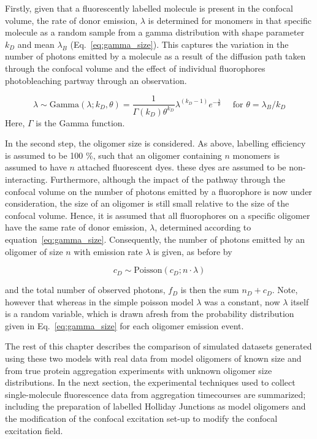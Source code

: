 Firstly, given that a fluorescently labelled molecule is present in the confocal volume, the rate of donor emission, $\lambda$ is determined for monomers in that specific molecule as a random sample from a gamma distribution with shape parameter $k_D$ and mean $\lambda_B$ (Eq.~\ref{eq:gamma_size}). This captures the variation in the number of photons emitted by a molecule as a result of the diffusion path taken through the confocal volume and the effect of individual fluorophores photobleaching partway through an observation.

\begin{equation}
\lambda \sim \text{Gamma}(\lambda; k_D, \theta) =  \frac{1}{\Gamma(k_D) \theta^{k_D}} \lambda^{(k_D - 1)} e^{-\frac{\lambda}{\theta}} \quad\text{ for } \theta = \lambda_B / k_D
\label{eq:gamma_size}
\end{equation} 
Here, $\Gamma$ is the Gamma function. 

In the second step, the oligomer size is considered. As above, labelling efficiency is assumed to be 100 \%, such that an oligomer containing $n$ monomers is assumed to have $n$ attached fluorescent dyes. these dyes are assumed to be non-interacting. Furthermore, although the impact of the pathway through the confocal volume on the number of photons emitted by a fluorophore is now under consideration, the size of an oligomer is still small relative to the size of the confocal volume. Hence, it is assumed that all fluorophores on a specific oligomer have the same rate of donor emission, $\lambda$, determined according to equation~\ref{eq:gamma_size}. Consequently, the number of photons emitted by an oligomer of size $n$ with emission rate $\lambda$ is given, as before by

\begin{equation}
c_D \sim \text{Poisson}(c_D; n \cdot \lambda)
\end{equation}  

and the total number of observed photons, $f_D$ is then the sum $n_D + c_D$. Note, however that whereas in the simple poisson model $\lambda$ was a constant, now $\lambda$ itself is a random variable, which is drawn afresh from the probability distribution given in Eq.~\ref{eq:gamma_size} for each oligomer emission event.

The rest of this chapter describes the comparison of simulated datasets generated using these two models with real data from model oligomers of known size and from true protein aggregation experiments with unknown oligomer size distributions. In the next section, the experimental techniques used to collect single-molecule fluorescence data from aggregation timecourses are summarized; including the preparation of labelled Holliday Junctions as model oligomers and the modification of the confocal excitation set-up to modify the confocal excitation field. 

